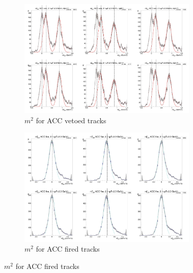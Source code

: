 \begin{figure}[H]
  \ContinuedFloat
    \begin{subfigure}{1\textwidth}
   \centering
   \includegraphics[width=0.94\textwidth]{hiptfits/neg/PSm2_cent0_ich0_accfire0_ptbin8.jpg}
    \caption{$m^2$ for ACC vetoed tracks}
    \end{subfigure}
    \begin{subfigure}{1\textwidth}
   \centering
   \includegraphics[width=0.94\textwidth]{hiptfits/neg/PSm2_cent0_ich0_accfire1_ptbin8.jpg}
    \caption{$m^2$ for ACC fired tracks}
    \end{subfigure}  
  \label{fig:acc21-23}
\end{figure}
